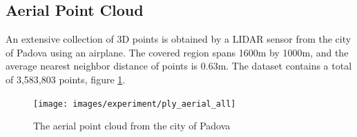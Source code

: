 \documentclass[11pt]{article}
\begin{document}
    \subsection{Aerial Point Cloud}
    An extensive collection of 3D points is obtained by a LIDAR sensor from the city of Padova
    using an airplane. The covered region spans 1600m by 1000m, and the average nearest neighbor distance
    of points is 0.63m. The dataset contains a total of 3,583,803 points, figure \ref{fig:ply_aerial_all}.

    \begin{figure}
    \centering
    \texttt{[image: images/experiment/ply\_aerial\_all]}
    \caption{The aerial point cloud from the city of Padova}
    \label{fig:ply_aerial_all}
    \end{figure}
\end{document}
